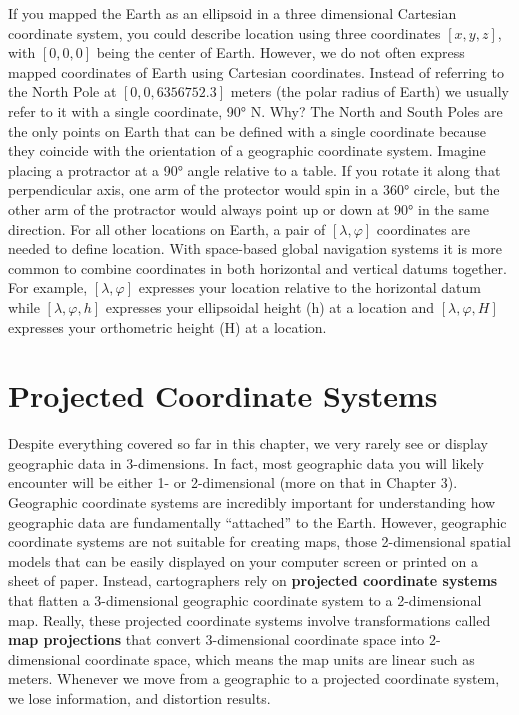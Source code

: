 \documentclass[
]{book}
\begin{document}
If you mapped the Earth as an ellipsoid in a three dimensional Cartesian coordinate system, you could describe location using three coordinates \([x,y,z]\), with \([0,0,0]\) being the center of Earth. However, we do not often express mapped coordinates of Earth using Cartesian coordinates. Instead of referring to the North Pole at \([0,0,6356752.3]\) meters (the polar radius of Earth) we usually refer to it with a single coordinate, 90° N. Why? The North and South Poles are the only points on Earth that can be defined with a single coordinate because they coincide with the orientation of a geographic coordinate system. Imagine placing a protractor at a 90° angle relative to a table. If you rotate it along that perpendicular axis, one arm of the protector would spin in a 360° circle, but the other arm of the protractor would always point up or down at 90° in the same direction. For all other locations on Earth, a pair of \([λ,φ]\) coordinates are needed to define location. With space-based global navigation systems it is more common to combine coordinates in both horizontal and vertical datums together. For example, \([λ,φ]\) expresses your location relative to the horizontal datum while \([λ,φ,h]\) expresses your ellipsoidal height (h) at a location and \([λ,φ,H]\) expresses your orthometric height (H) at a location.

\hypertarget{projected-coordinate-systems}{%
\section{Projected Coordinate Systems}\label{projected-coordinate-systems}}

Despite everything covered so far in this chapter, we very rarely see or display geographic data in 3-dimensions. In fact, most geographic data you will likely encounter will be either 1- or 2-dimensional (more on that in Chapter 3). Geographic coordinate systems are incredibly important for understanding how geographic data are fundamentally ``attached'' to the Earth. However, geographic coordinate systems are not suitable for creating maps, those 2-dimensional spatial models that can be easily displayed on your computer screen or printed on a sheet of paper. Instead, cartographers rely on \textbf{projected coordinate systems} that flatten a 3-dimensional geographic coordinate system to a 2-dimensional map. Really, these projected coordinate systems involve transformations called \textbf{map projections} that convert 3-dimensional coordinate space into 2-dimensional coordinate space, which means the map units are linear such as meters. Whenever we move from a geographic to a projected coordinate system, we lose information, and distortion results.
\end{document}
